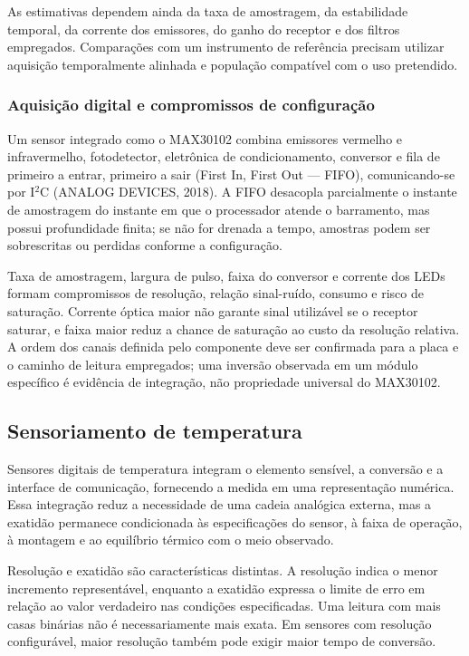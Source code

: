 \documentclass{article}
\begin{document}
As estimativas dependem ainda da taxa de amostragem, da estabilidade temporal, da corrente dos emissores, do ganho do receptor e dos filtros empregados. Compara\c{c}\~oes com um instrumento de refer\^encia precisam utilizar aquisi\c{c}\~ao temporalmente alinhada e popula\c{c}\~ao compat\'ivel com o uso pretendido.


\subsubsection{Aquisi\c{c}\~ao digital e compromissos de configura\c{c}\~ao}


Um sensor integrado como o MAX30102 combina emissores vermelho e infravermelho, fotodetector, eletr\^onica de condicionamento, conversor e fila de primeiro a entrar, primeiro a sair (First In, First Out --- FIFO), comunicando-se por I$^2$C (ANALOG DEVICES, 2018). A FIFO desacopla parcialmente o instante de amostragem do instante em que o processador atende o barramento, mas possui profundidade finita; se n\~ao for drenada a tempo, amostras podem ser sobrescritas ou perdidas conforme a configura\c{c}\~ao.


Taxa de amostragem, largura de pulso, faixa do conversor e corrente dos LEDs formam compromissos de resolu\c{c}\~ao, rela\c{c}\~ao sinal-ru\'ido, consumo e risco de satura\c{c}\~ao. Corrente \'optica maior n\~ao garante sinal utiliz\'avel se o receptor saturar, e faixa maior reduz a chance de satura\c{c}\~ao ao custo da resolu\c{c}\~ao relativa. A ordem dos canais definida pelo componente deve ser confirmada para a placa e o caminho de leitura empregados; uma invers\~ao observada em um m\'odulo espec\'ifico \'e evid\^encia de integra\c{c}\~ao, n\~ao propriedade universal do MAX30102.


\subsection{Sensoriamento de temperatura}


Sensores digitais de temperatura integram o elemento sens\'ivel, a convers\~ao e a interface de comunica\c{c}\~ao, fornecendo a medida em uma representa\c{c}\~ao num\'erica. Essa integra\c{c}\~ao reduz a necessidade de uma cadeia anal\'ogica externa, mas a exatid\~ao permanece condicionada \`as especifica\c{c}\~oes do sensor, \`a faixa de opera\c{c}\~ao, \`a montagem e ao equil\'ibrio t\'ermico com o meio observado.


Resolu\c{c}\~ao e exatid\~ao s\~ao caracter\'isticas distintas. A resolu\c{c}\~ao indica o menor incremento represent\'avel, enquanto a exatid\~ao expressa o limite de erro em rela\c{c}\~ao ao valor verdadeiro nas condi\c{c}\~oes especificadas. Uma leitura com mais casas bin\'arias n\~ao \'e necessariamente mais exata. Em sensores com resolu\c{c}\~ao configur\'avel, maior resolu\c{c}\~ao tamb\'em pode exigir maior tempo de convers\~ao.
\end{document}
